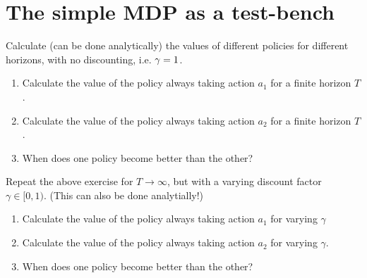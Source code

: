 \documentclass[twoside,a4paper]{article}
\begin{document}
\section{The simple MDP as a test-bench}
\label{sec:simple-mdp-as}
\begin{exercise}[30-60!]
  Calculate (can be done analytically) the values of different policies for different horizons, with no discounting, i.e. $\gamma = 1$.
  \begin{enumerate}
  \item Calculate the value of the policy always taking action $a_1$ for a finite horizon $T$. 
  \item Calculate the value of the policy always taking action $a_2$ for a finite horizon $T$. 
  \item When does one policy become better than the other?
  \end{enumerate}
  \label{exercise:simple-mdp-finite-horizon}
\end{exercise}


\begin{exercise}[30-60!]
  Repeat the above exercise for $T \to \infty$, but with a varying discount factor $\gamma \in [0,1)$.  (This can also be done analytially!)
  \begin{enumerate}
  \item Calculate the value of the policy always taking action $a_1$ for varying $\gamma$
  \item Calculate the value of the policy always taking action $a_2$ for varying $\gamma$. 
  \item When does one policy become better than the other?
  \end{enumerate}
  \label{exercise:simple-mdp-discounted}
\end{exercise}
\end{document}
